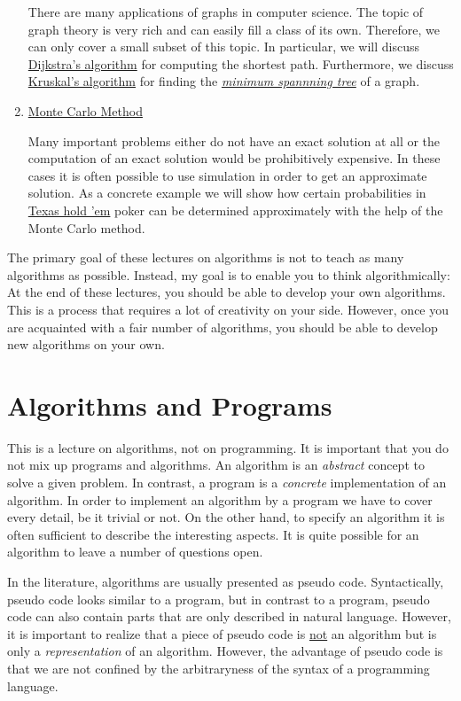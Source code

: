 \begin{enumerate}
      There are many applications of graphs in computer science.  The topic of graph theory is very
      rich and can easily fill a class of its own.  Therefore, we can only cover a small subset of this topic.
      In particular, we will discuss
      \href{http://en.wikipedia.org/wiki/Dijkstra%27s_algorithm}{Dijkstra's algorithm}
      for computing the shortest path.
      Furthermore, we discuss 
      \href{https://en.wikipedia.org/wiki/Kruskal%27s_algorithm}{Kruskal's algorithm} for finding the
      \href{https://en.wikipedia.org/wiki/Minimum_spanning_tree}{\emph{minimum spannning tree}} of a graph.
\item \href{http://en.wikipedia.org/wiki/Monte_Carlo_method}{Monte Carlo Method} 
 
      Many important problems either do not have an exact solution at all or the computation of an
      exact solution would be prohibitively expensive.  In these cases it is often possible to use 
      simulation in order to get an approximate solution.  As a concrete example we will show
      how certain probabilities in \href{http://en.wikipedia.org/wiki/Texas_hold_%27em}{Texas hold 'em} 
      poker can be determined approximately with the help of the Monte
      Carlo method.
\end{enumerate}
The primary goal of these lectures on algorithms is not to teach as many algorithms as possible.
Instead, my goal is to enable you to think algorithmically:  At the end of these
lectures, you should be able to develop your own algorithms.  This is a process that
requires a lot of creativity on your side.
However, once you are acquainted with a fair number of algorithms, you should be able to develop
new algorithms on your own.

\section{Algorithms and Programs}
This is a lecture on algorithms, not on programming.  It is important that you do not mix up
programs and algorithms.  An algorithm is an \emph{abstract} concept to solve a given problem.  In
contrast, a program is a \emph{concrete} implementation of an algorithm.  In order to implement an
algorithm by a program we have to cover every detail, be it trivial or not.  On the other hand, 
to specify an algorithm it is often sufficient to describe the interesting aspects.  It is
quite possible for an algorithm to leave a number of questions open.

In the literature, algorithms are usually presented as pseudo code.  Syntactically, pseudo code looks
similar to a program, but in contrast to a program, pseudo code can also contain parts that are only
described in natural language.   However, it is important to realize that a piece of pseudo code is
\underline{not} an algorithm but is only a \emph{ representation} of an algorithm.  However, the
advantage of pseudo code is that we are not confined by the arbitraryness of the syntax of a
programming language.

